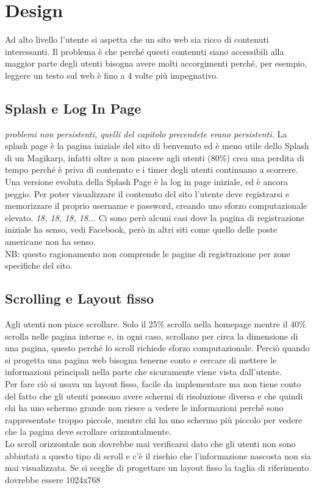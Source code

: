 \section{Design}
Ad alto livello l'utente si aspetta che un sito web sia ricco di contenuti interessanti.
Il problema è che perché questi contenuti siano accessibili alla maggior parte degli utenti bisogna avere molti accorgimenti perché, per esempio, leggere un testo sul web è fino a 4 volte più impegnativo.

\subsection{Splash e Log In Page}
\textit{problemi non persistenti, quelli del capitolo precendete erano persistenti.}
La splash page è la pagina iniziale del sito di benvenuto ed è meno utile dello Splash di un Magikarp, infatti oltre a non piacere agli utenti (80\%) crea una perdita di tempo perché è priva di contenuto e i timer degli utenti continuano a scorrere.\\
Una versione evoluta della Splash Page è la log in page iniziale, ed è ancora peggio.
Per poter visualizzare il contenuto del sito l'utente deve registrarsi e memorizzare il proprio username e password, creando uno sforzo computazionale elevato. \textit{18, 18, 18, 18...}
Ci sono però alcuni casi dove la pagina di registrazione iniziale ha senso, vedi Facebook, però in altri siti come quello delle poste americane non ha senso.\\
NB: questo ragionamento non comprende le pagine di registrazione per zone specifiche del sito.

\subsection{Scrolling e Layout fisso}
Agli utenti non piace scrollare. Solo il 25\% scrolla nella homepage mentre il 40\% scrolla nelle pagina interne e, in ogni caso, scrollano per circa la dimensione di una pagina, questo perché lo scroll richiede sforzo computazionale.
Perciò quando si progetta una pagina web bisogna tenerne conto e cercare di mettere le informazioni principali nella parte che sicuramente viene vista dall'utente.\\
Per fare ciò si usava un layout fisso, facile da implementare ma non tiene conto del fatto che gli utenti possono avere schermi di risoluzione diversa e che quindi chi ha uno schermo grande non riesce a vedere le informazioni perché sono rappresentate troppo piccole, mentre chi ha uno schermo più piccolo per vedere che la pagina deve scrollare orizzontalmente.\\
Lo scroll orizzontale non dovrebbe mai verificarsi dato che gli utenti non sono abbiutati a questo tipo di scroll e c'è il rischio che l'informazione nascosta non sia mai visualizzata.
Se si sceglie di progettare un layout fisso la taglia di riferimento dovrebbe essere 1024x768

